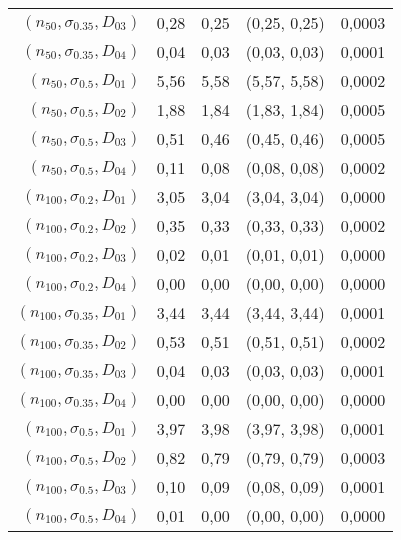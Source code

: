 \documentclass[preprint,12pt]{elsarticle}
\begin{document}
\begin{table}[htbp]
\begin{tabular}{rrrcr}
    $(n_{50},\sigma_{0.35},D_{03})$ & 0,28  & 0,25  & (0,25, 0,25) & 0,0003 \\
    $(n_{50},\sigma_{0.35},D_{04})$ & 0,04  & 0,03  & (0,03, 0,03) & 0,0001\\
    $(n_{50},\sigma_{0.5},D_{01})$ & 5,56  & 5,58  & (5,57, 5,58) & 0,0002 \\
    $(n_{50},\sigma_{0.5},D_{02})$  & 1,88  & 1,84  & (1,83, 1,84) & 0,0005 \\
    $(n_{50},\sigma_{0.5},D_{03})$ & 0,51  & 0,46  & (0,45, 0,46) & 0,0005 \\
    $(n_{50},\sigma_{0.5},D_{04})$ & 0,11  & 0,08  & (0,08, 0,08) & 0,0002 \\
    $(n_{100},\sigma_{0.2},D_{01})$  & 3,05  & 3,04  & (3,04, 3,04) & 0,0000 \\
    $(n_{100},\sigma_{0.2},D_{02})$ & 0,35  & 0,33  & (0,33, 0,33) & 0,0002 \\
    $(n_{100},\sigma_{0.2},D_{03})$ & 0,02  & 0,01  & (0,01, 0,01) & 0,0000 \\
    $(n_{100},\sigma_{0.2},D_{04})$ & 0,00  & 0,00  & (0,00, 0,00) & 0,0000 \\
    $(n_{100},\sigma_{0.35},D_{01})$ & 3,44  & 3,44  & (3,44, 3,44) & 0,0001 \\
    $(n_{100},\sigma_{0.35},D_{02})$ & 0,53  & 0,51  & (0,51, 0,51) & 0,0002 \\
    $(n_{100},\sigma_{0.35},D_{03})$ & 0,04  & 0,03  & (0,03, 0,03) & 0,0001 \\
    $(n_{100},\sigma_{0.35},D_{04})$ & 0,00  & 0,00  & (0,00, 0,00) & 0,0000 \\
    $(n_{100},\sigma_{0.5},D_{01})$  & 3,97  & 3,98  & (3,97, 3,98) & 0,0001 \\
    $(n_{100},\sigma_{0.5},D_{02})$ & 0,82  & 0,79  & (0,79, 0,79) & 0,0003 \\
    $(n_{100},\sigma_{0.5},D_{03})$ & 0,10  & 0,09  & (0,08, 0,09) & 0,0001\\
    $(n_{100},\sigma_{0.5},D_{04})$ & 0,01  & 0,00  & (0,00, 0,00) & 0,0000 \\
    \bottomrule
    \end{tabular}%
  \label{uniform2}%
\end{table}%
\end{document}
